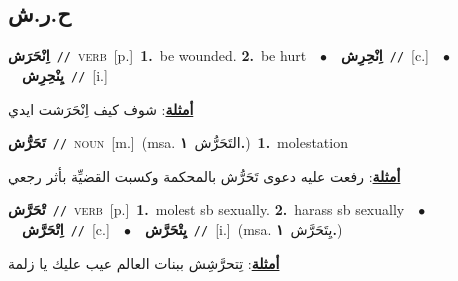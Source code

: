 \documentclass[10pt,a4paper,twoside]{article} %
\begin{document}
\begin{multicols}{2}
\vspace{-3mm}
\subsection*{\color{blue}\foreignlanguage{arabic}{ح.ر.ش}\color{blue}{}} 

{\setlength\topsep{0pt}\textbf{\foreignlanguage{arabic}{اِنْحَرَش}}\ {\color{gray}\texttt{//}\color{black}}\ \textsc{verb}\ [p.]\ \textbf{1.}~be wounded.  \textbf{2.}~be hurt\ \ $\bullet$\ \ \setlength\topsep{0pt}\textbf{\foreignlanguage{arabic}{اِنْحِرِش}}\ {\color{gray}\texttt{//}\color{black}}\ [c.]\ \ $\bullet$\ \ \setlength\topsep{0pt}\textbf{\foreignlanguage{arabic}{يِنْحِرِش}}\ {\color{gray}\texttt{//}\color{black}}\ [i.]\  \begin{flushright}\color{gray}\foreignlanguage{arabic}{\textbf{\underline{\foreignlanguage{arabic}{أمثلة}}}: شوف كيف اِنْحَرَشت ايدي}\end{flushright}\color{black}} \vspace{2mm}

{\setlength\topsep{0pt}\textbf{\foreignlanguage{arabic}{تَحَرُّش}}\ {\color{gray}\texttt{//}\color{black}}\ \textsc{noun}\ [m.]\ \color{gray}(msa. \foreignlanguage{arabic}{التَحَرُّش}~\foreignlanguage{arabic}{\textbf{١.}})\color{black}\ \textbf{1.}~molestation\  \begin{flushright}\color{gray}\foreignlanguage{arabic}{\textbf{\underline{\foreignlanguage{arabic}{أمثلة}}}: رفعت عليه دعوى تَحَرُّش بالمحكمة وكسبت القضيِّة بأثر رجعي}\end{flushright}\color{black}} \vspace{2mm}

{\setlength\topsep{0pt}\textbf{\foreignlanguage{arabic}{تْحَرَّش}}\ {\color{gray}\texttt{//}\color{black}}\ \textsc{verb}\ [p.]\ \textbf{1.}~molest sb sexually.  \textbf{2.}~harass sb sexually\ \ $\bullet$\ \ \setlength\topsep{0pt}\textbf{\foreignlanguage{arabic}{اِتْحَرَّش}}\ {\color{gray}\texttt{//}\color{black}}\ [c.]\ \ $\bullet$\ \ \setlength\topsep{0pt}\textbf{\foreignlanguage{arabic}{يِتْحَرَّش}}\ {\color{gray}\texttt{//}\color{black}}\ [i.]\ \color{gray}(msa. \foreignlanguage{arabic}{يِتَحَرَّش}~\foreignlanguage{arabic}{\textbf{١.}})\color{black}\  \begin{flushright}\color{gray}\foreignlanguage{arabic}{\textbf{\underline{\foreignlanguage{arabic}{أمثلة}}}: تِتحرَّشِش ببنات العالم عيب عليك يا زلمة}\end{flushright}\color{black}} \vspace{2mm}


\end{multicols}
\end{document}

